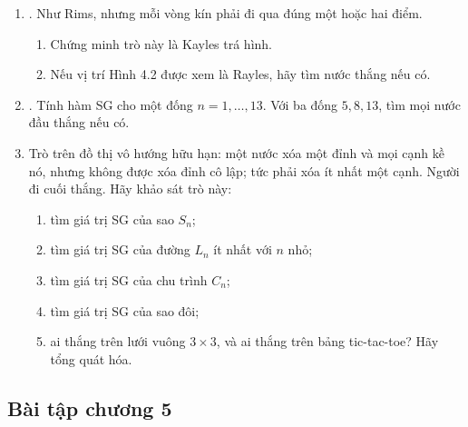 \documentclass[11pt]{article}
\begin{document}
\begin{enumerate}
\begin{enumerate}
    \item Với vị trí Hình 4.2 của nguồn, tìm nước thắng nếu có.
  \end{enumerate}
  \item {}. Như Rims, nhưng mỗi vòng kín phải đi qua đúng một hoặc
  hai điểm.
  \begin{enumerate}
    \item Chứng minh trò này là Kayles trá hình.
    \item Nếu vị trí Hình 4.2 được xem là Rayles, hãy tìm nước thắng nếu có.
  \end{enumerate}
  \item {}. Tính hàm SG cho một đống \(n=1,\ldots,13\). Với ba
  đống \(5,8,13\), tìm mọi nước đầu thắng nếu có.
  \item Trò trên đồ thị vô hướng hữu hạn: một nước xóa một đỉnh và mọi cạnh
  kề nó, nhưng không được xóa đỉnh cô lập; tức phải xóa ít nhất một cạnh.
  Người đi cuối thắng. Hãy khảo sát trò này:
  \begin{enumerate}
    \item tìm giá trị SG của sao \(S_n\);
    \item tìm giá trị SG của đường \(L_n\) ít nhất với \(n\) nhỏ;
    \item tìm giá trị SG của chu trình \(C_n\);
    \item tìm giá trị SG của sao đôi;
    \item ai thắng trên lưới vuông \(3\times3\), và ai thắng trên bảng
    tic-tac-toe? Hãy tổng quát hóa.
  \end{enumerate}
\end{enumerate}

\subsection{Bài tập chương 5}
\end{document}
